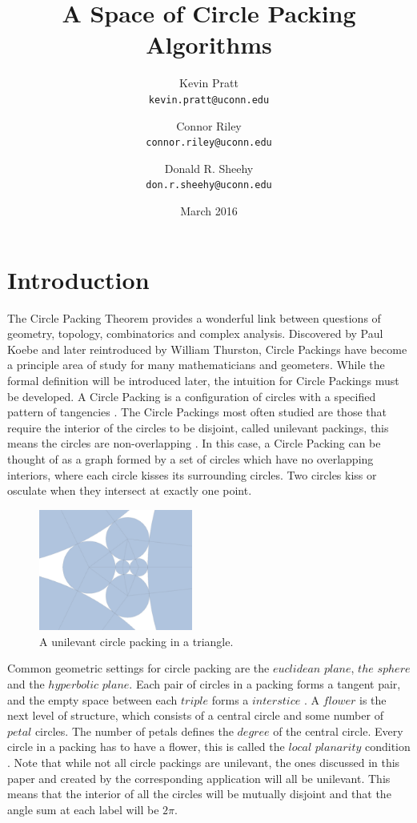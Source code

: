 \documentclass[11pt]{article}
\title{A Space of Circle Packing Algorithms}
\author{
  Kevin Pratt\\
  \texttt{kevin.pratt@uconn.edu}
  \and
  Connor Riley\\
  \texttt{connor.riley@uconn.edu}
    \and
  Donald R. Sheehy\\
  \texttt{don.r.sheehy@uconn.edu}
}\date{March 2016}
\begin{document}
\maketitle

\section{Introduction}
The Circle Packing Theorem provides a wonderful link between questions of geometry, topology, combinatorics and complex analysis. Discovered by Paul Koebe and later reintroduced by William Thurston, Circle Packings have become a principle area of study for many mathematicians and geometers. While the formal definition will be introduced later, the intuition for Circle Packings must be developed. A Circle Packing is a configuration of circles with a specified pattern of tangencies \cite{stephenson05introduction}. The Circle Packings most often studied are those that require the interior of the circles to be disjoint, called unilevant packings, this means the circles are non-overlapping \cite{stephenson05introduction}. In this case, a Circle Packing can be thought of as a graph formed by a set of circles which have no overlapping interiors, where each circle kisses its surrounding circles. Two circles kiss or osculate when they intersect at exactly one point. 

\begin{figure}
  \begin{center}
    \includegraphics[scale=.18,width=0.45\textwidth]{circlepacking_1}
  \end{center}
  \caption{A unilevant circle packing in a triangle.}
\end{figure}

Common geometric settings for circle packing are the $euclidean$ $plane$, $the$ $sphere$ and the $hyperbolic$ $plane$. Each pair of circles in a packing forms a tangent pair, and the empty space between each $triple$ forms a $interstice$ \cite{stephenson05introduction}. A $flower$ is the next level of structure, which consists of a central circle and some number of $petal$ circles. The number of petals defines the $degree$ of the central circle. Every circle in a packing has to have a flower, this is called the $local$ $planarity$ condition \cite{stephenson05introduction}. Note that while not all circle packings are unilevant, the ones discussed in this paper and created by the corresponding application will all be unilevant. This means that the interior of all the circles will be mutually disjoint and that the angle sum at each label will be $2\pi$.
\end{document}
